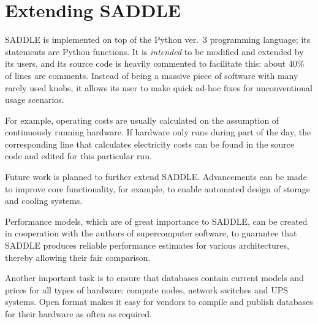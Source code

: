 \documentclass[runningheads,a4paper]{llncs}
\begin{document}
\section{Extending SADDLE}

SADDLE is implemented on top of the Python ver.~3 programming language; its statements are Python functions. It is \emph{intended} to be modified and extended by its users, and its source code is heavily commented to facilitate this: about 40\% of lines are comments. Instead of being a massive piece of software with many rarely used knobs, it allows its user to make quick ad-hoc fixes for unconventional usage scenarios.

For example, operating costs are usually calculated on the assumption of continuously running hardware. If hardware only runs during part of the day, the corresponding line that calculates electricity costs can be found in the source code and edited for this particular run.

Future work is planned to further extend SADDLE. Advancements can be made to improve core functionality, for example, to enable automated design of storage and cooling systems.

Performance models, which are of great importance to SADDLE, can be created in cooperation with the authors of supercomputer software, to guarantee that SADDLE produces reliable performance estimates for various architectures, thereby allowing their fair comparison.

Another important task is to ensure that databases contain current models and prices for all types of hardware: compute nodes, network switches and UPS systems. Open format makes it easy for vendors to compile and publish databases for their hardware as often as required.



\end{document}
